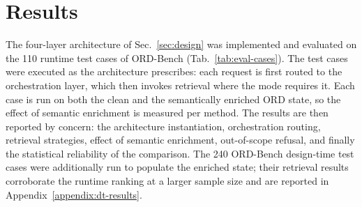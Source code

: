 \documentclass[10pt,twocolumn]{article}
\begin{document}




\section{Results}
\label{sec:results}

The four-layer architecture of Sec.~\ref{sec:design} was implemented and evaluated on the 110 runtime test cases of ORD-Bench (Tab.~\ref{tab:eval-cases}). The test cases were executed as the architecture prescribes: each request is first routed to the orchestration layer, which then invokes retrieval where the mode requires it. Each case is run on both the clean and the semantically enriched ORD state, so the effect of semantic enrichment is measured per method. The results are then reported by concern: the architecture instantiation, orchestration routing, retrieval strategies, effect of semantic enrichment, out-of-scope refusal, and finally the statistical reliability of the comparison. The 240 ORD-Bench design-time test cases were additionally run to populate the enriched state; their retrieval results corroborate the runtime ranking at a larger sample size and are reported in Appendix~\ref{appendix:dt-results}.
\end{document}
